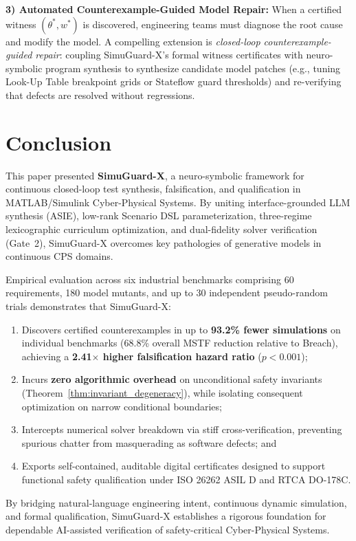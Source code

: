 \documentclass[journal]{IEEEtran}
\begin{document}
\noindent\textbf{3) Automated Counterexample-Guided Model Repair:}
When a certified witness $(\theta^*, w^*)$ is discovered, engineering teams must diagnose the root cause and modify the model. A compelling extension is \textit{closed-loop counterexample-guided repair}: coupling SimuGuard-X's formal witness certificates with neuro-symbolic program synthesis to synthesize candidate model patches (e.g., tuning Look-Up Table breakpoint grids or Stateflow guard thresholds) and re-verifying that defects are resolved without regressions.

\section{Conclusion}
\label{sec:conclusion}
This paper presented \textbf{SimuGuard-X}, a neuro-symbolic framework for continuous closed-loop test synthesis, falsification, and qualification in MATLAB/Simulink Cyber-Physical Systems. By uniting interface-grounded LLM synthesis (ASIE), low-rank Scenario DSL parameterization, three-regime lexicographic curriculum optimization, and dual-fidelity solver verification (Gate~2), SimuGuard-X overcomes key pathologies of generative models in continuous CPS domains.

Empirical evaluation across six industrial benchmarks comprising 60 requirements, 180 model mutants, and up to 30 independent pseudo-random trials demonstrates that SimuGuard-X:
\begin{enumerate}
    \item Discovers certified counterexamples in up to \textbf{93.2\% fewer simulations} on individual benchmarks (68.8\% overall MSTF reduction relative to Breach), achieving a \textbf{2.41$\times$ higher falsification hazard ratio} ($p < 0.001$);
    \item Incurs \textbf{zero algorithmic overhead} on unconditional safety invariants (Theorem~\ref{thm:invariant_degeneracy}), while isolating consequent optimization on narrow conditional boundaries;
    \item Intercepts numerical solver breakdown via stiff cross-verification, preventing spurious chatter from masquerading as software defects; and
    \item Exports self-contained, auditable digital certificates designed to support functional safety qualification under ISO 26262 ASIL D and RTCA DO-178C.
\end{enumerate}
By bridging natural-language engineering intent, continuous dynamic simulation, and formal qualification, SimuGuard-X establishes a rigorous foundation for dependable AI-assisted verification of safety-critical Cyber-Physical Systems.



\end{document}
